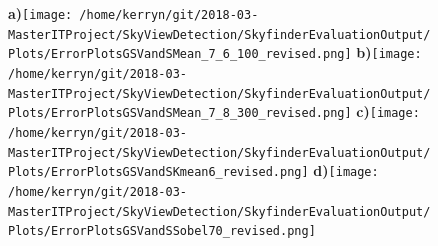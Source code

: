 \documentclass{article}
\begin{document}
\begin{figure}
\centering
\textbf{\scriptsize{a)}}\texttt{[image: /home/kerryn/git/2018-03-MasterITProject/SkyViewDetection/SkyfinderEvaluationOutput/Plots/ErrorPlotsGSVandSMean\_7\_6\_100\_revised.png]} 
\textbf{\scriptsize{b)}}\texttt{[image: /home/kerryn/git/2018-03-MasterITProject/SkyViewDetection/SkyfinderEvaluationOutput/Plots/ErrorPlotsGSVandSMean\_7\_8\_300\_revised.png]}
\textbf{\scriptsize{c)}}\texttt{[image: /home/kerryn/git/2018-03-MasterITProject/SkyViewDetection/SkyfinderEvaluationOutput/Plots/ErrorPlotsGSVandSKmean6\_revised.png]}
\textbf{\scriptsize{d)}}\texttt{[image: /home/kerryn/git/2018-03-MasterITProject/SkyViewDetection/SkyfinderEvaluationOutput/Plots/ErrorPlotsGSVandSSobel70\_revised.png]}
\end{figure}
\clearpage %
\end{document}
